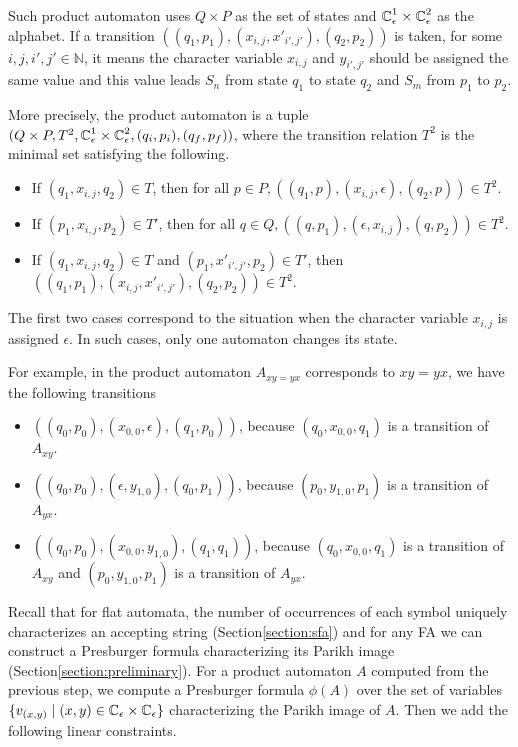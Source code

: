 \documentclass{llncs}
\begin{document}
Such product automaton uses $Q\times P$ as the set of states and $\mbox{$\mathbb{C}$}^1_\epsilon \times \mbox{$\mathbb{C}$}^2_\epsilon$ as the alphabet. If a transition $((q_1,p_1), (x_{i,j},x'_{i',j'}),(q_2,p_2))$ is taken, for some $i,j,i',j' \in \mathbb{N}$, it means the character variable $x_{i,j}$ and $y_{i',j'}$ should be assigned the same value and this value leads $S_n$ from state $q_1$ to state $q_2$ and $S_m$ from $p_1$ to $p_2$.

More precisely, the product automaton is a tuple $(Q\times P, T^2, \mbox{$\mathbb{C}$}^1_\epsilon \times \mbox{$\mathbb{C}$}^2_\epsilon, (q_i,p_i),(q_f,p_f))$, where the transition relation $T^2$ is the minimal set satisfying the following.

\begin{itemize}
\item If $(q_1,x_{i,j},q_2) \in T$, then for all $p\in P,((q_1,p),(x_{i,j},\epsilon),(q_2,p))\in T^2$.
\item If $(p_1,x_{i,j},p_2) \in T'$, then for all $q\in Q,((q,p_1),(\epsilon,x_{i,j}),(q,p_2))\in T^2$.
\item If $(q_1,x_{i,j},q_2) \in T$ and $(p_1,x'_{i',j'},p_2) \in T'$, then $((q_1,p_1),(x_{i,j},x'_{i',j'}),(q_2,p_2))\in T^2$.
\end{itemize}	
The first two cases correspond to the situation when the character variable $x_{i,j}$ is assigned $\epsilon$. In such cases, only one automaton changes its state.

For example, in the product automaton $A_{xy=yx}$ corresponds to $xy=yx$, we have the following transitions
\begin{itemize}
	\item $((q_0,p_0), (x_{0,0},\epsilon),(q_1,p_0))$, because $(q_0,x_{0,0},q_1)$ is a transition of $A_{xy}$.
	\item $((q_0,p_0), (\epsilon,y_{1,0}),(q_0,p_1))$, because $(p_0,y_{1,0},p_1)$ is a transition of $A_{yx}$.
	\item $((q_0,p_0), (x_{0,0},y_{1,0}),(q_1,q_1))$, because $(q_0,x_{0,0},q_1)$ is a transition of $A_{xy}$ and $(p_0,y_{1,0},p_1)$ is a transition of $A_{yx}$.
\end{itemize}

Recall that for flat automata, the number of occurrences of each symbol uniquely characterizes an accepting string (Section\ref{section:sfa}) and for any FA we can construct a Presburger formula characterizing its Parikh image (Section\ref{section:preliminary}). For a product automaton $A$ computed from the previous step, we compute a Presburger formula $\phi(A)$ over the set of variables $\{v_{(x,y)}\mid (x,y) \in \mbox{$\mathbb{C}$}_\epsilon \times \mbox{$\mathbb{C}$}_\epsilon\}$ characterizing the Parikh image of $A$. Then we add the following linear constraints.
\end{document}
